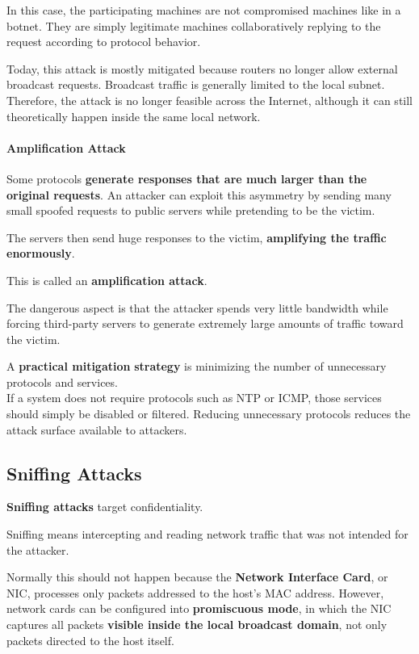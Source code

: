 \documentclass{article}
\begin{document}
In this case, the participating machines are not compromised machines like in a botnet. They are simply legitimate machines collaboratively replying to the request according to protocol behavior.

Today, this attack is mostly mitigated because routers no longer allow external broadcast requests. Broadcast traffic is generally limited to the local subnet. Therefore, the attack is no longer feasible across the Internet, although it can still theoretically happen inside the same local network.

\paragraph{Amplification Attack}

Some protocols \textbf{generate responses that are much larger than the original requests}. An attacker can exploit this asymmetry by sending many small spoofed requests to public servers while pretending to be the victim.

The servers then send huge responses to the victim, \textbf{amplifying the traffic enormously}.

This is called an \textbf{amplification attack}.

The dangerous aspect is that the attacker spends very little bandwidth while forcing third-party servers to generate extremely large amounts of traffic toward the victim.

A \textbf{practical mitigation} \textbf{strategy} is minimizing the number of unnecessary protocols and services.\\
If a system does not require protocols such as NTP or ICMP, those services should simply be disabled or filtered. Reducing unnecessary protocols reduces the attack surface available to attackers.

\subsection{Sniffing Attacks}

\textbf{Sniffing attacks} target confidentiality.

Sniffing means intercepting and reading network traffic that was not intended for the attacker.

Normally this should not happen because the \textbf{Network Interface Card}, or NIC, processes only packets addressed to the host's MAC address. However, network cards can be configured into \textbf{promiscuous mode}, in which the NIC captures all packets \textbf{visible inside the local broadcast domain}, not only packets directed to the host itself.
\end{document}
